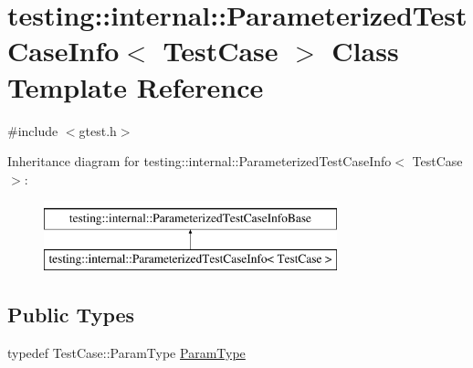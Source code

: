 \hypertarget{classtesting_1_1internal_1_1_parameterized_test_case_info}{\section{testing\-:\-:internal\-:\-:Parameterized\-Test\-Case\-Info$<$ Test\-Case $>$ Class Template Reference}
\label{classtesting_1_1internal_1_1_parameterized_test_case_info}
}


{\ttfamily \#include $<$gtest.\-h$>$}

Inheritance diagram for testing\-:\-:internal\-:\-:Parameterized\-Test\-Case\-Info$<$ Test\-Case $>$\-:\begin{figure}[H]
\begin{center}
\leavevmode
\includegraphics[height=2.000000cm]{classtesting_1_1internal_1_1_parameterized_test_case_info}
\end{center}
\end{figure}
\subsection*{Public Types}
\begin{DoxyCompactItemize}
\item 
typedef Test\-Case\-::\-Param\-Type \hyperlink{classtesting_1_1internal_1_1_parameterized_test_case_info_a643a87e178bf92a4246ce21054e44b96}{Param\-Type}
\end{DoxyCompactItemize}
